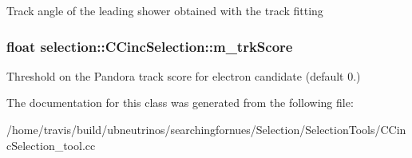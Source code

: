 Track angle of the leading shower obtained with the track fitting \hypertarget{classselection_1_1CCincSelection_a2c3b80516e3731ec9b4f5ccbee6864ba}{
\subsubsection[{m\-\_\-trk\-Score}]{\setlength{\rightskip}{0pt plus 5cm}float selection\-::\-C\-Cinc\-Selection\-::m\-\_\-trk\-Score\hspace{0.3cm}{\ttfamily [private]}}}\label{classselection_1_1CCincSelection_a2c3b80516e3731ec9b4f5ccbee6864ba}
Threshold on the Pandora track score for electron candidate (default 0.) 

The documentation for this class was generated from the following file\-:\begin{DoxyCompactItemize}
\item 
/home/travis/build/ubneutrinos/searchingfornues/\-Selection/\-Selection\-Tools/C\-Cinc\-Selection\-\_\-tool.\-cc\end{DoxyCompactItemize}
